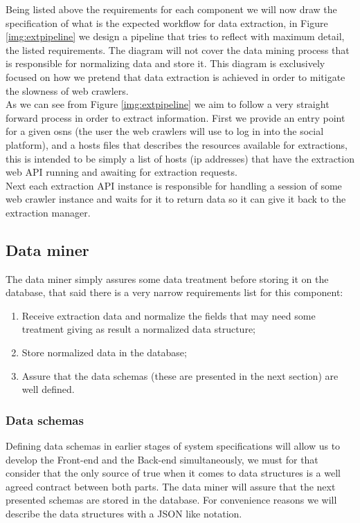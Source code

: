 Being listed above the requirements for each component we will now draw the specification of what is the expected workflow for data extraction, in Figure \ref{img:extpipeline} we design a pipeline that tries to reflect with maximum detail, the listed requirements. The diagram will not cover the data mining process that is responsible for normalizing data and store it. This diagram is exclusively focused on how we pretend that data extraction is achieved in order to mitigate the slowness of web crawlers.\\
\indent As we can see from Figure \ref{img:extpipeline} we aim to follow a very straight forward process in order to extract information. First we provide an entry point for a given \glspl{osn} (the user the web crawlers will use to log in into the social platform), and a hosts files that describes the resources available for extractions, this is intended to be simply a list of hosts (ip addresses) that have the extraction web API running and awaiting for extraction requests.\\
\indent Next each extraction API instance is responsible for handling a session of some web crawler instance and waits for it to return data so it can give it back to the extraction manager.

\clearpage

\subsection{Data miner}

The data miner simply assures some data treatment before storing it on the database, that said there is a very narrow requirements list for this component:

\begin{enumerate}
\item Receive extraction data and normalize the fields that may need some treatment giving as result a normalized data structure;
\item Store normalized data in the database;
\item Assure that the data schemas (these are presented in the next section) are well defined.
\end{enumerate}

\subsubsection{Data schemas}

Defining data schemas in earlier stages of system specifications will allow us to develop the Front-end and the Back-end simultaneously, we must for that consider that the only source of true when it comes to data structures is a well agreed contract between both parts. The data miner will assure that the next presented schemas are stored in the database. For convenience reasons we will describe the data structures with a JSON like notation.

